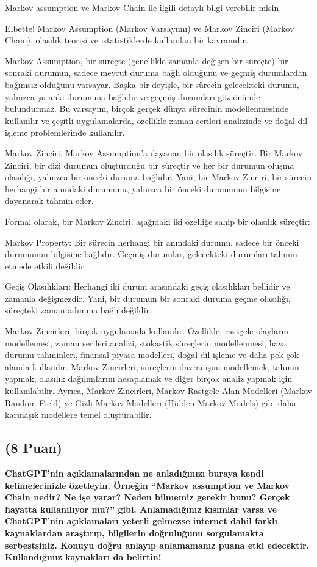 \documentclass[11pt]{article}
\begin{document}
Markov assumption ve Markov Chain ile ilgili detaylı bilgi verebilir misin 

Elbette! Markov Assumption (Markov Varsayımı) ve Markov Zinciri (Markov Chain), olasılık teorisi ve istatistiklerde kullanılan bir kavramdır.

Markov Assumption, bir süreçte (genellikle zamanla değişen bir süreçte) bir sonraki durumun, sadece mevcut duruma bağlı olduğunu ve geçmiş durumlardan bağımsız olduğunu varsayar. Başka bir deyişle, bir sürecin gelecekteki durumu, yalnızca şu anki durumuna bağlıdır ve geçmiş durumları göz önünde bulundurmaz. Bu varsayım, birçok gerçek dünya sürecinin modellenmesinde kullanılır ve çeşitli uygulamalarda, özellikle zaman serileri analizinde ve doğal dil işleme problemlerinde kullanılır.

Markov Zinciri, Markov Assumption'a dayanan bir olasılık süreçtir. Bir Markov Zinciri, bir dizi durumun oluşturduğu bir süreçtir ve her bir durumun oluşma olasılığı, yalnızca bir önceki duruma bağlıdır. Yani, bir Markov Zinciri, bir sürecin herhangi bir anındaki durumunu, yalnızca bir önceki durumunun bilgisine dayanarak tahmin eder.

Formal olarak, bir Markov Zinciri, aşağıdaki iki özelliğe sahip bir olasılık süreçtir:

Markov Property: Bir sürecin herhangi bir anındaki durumu, sadece bir önceki durumunun bilgisine bağlıdır. Geçmiş durumlar, gelecekteki durumları tahmin etmede etkili değildir.

Geçiş Olasılıkları: Herhangi iki durum arasındaki geçiş olasılıkları bellidir ve zamanla değişmezdir. Yani, bir durumun bir sonraki duruma geçme olasılığı, süreçteki zaman adımına bağlı değildir.

Markov Zincirleri, birçok uygulamada kullanılır. Özellikle, rastgele olayların modellemesi, zaman serileri analizi, stokastik süreçlerin modellenmesi, hava durumu tahminleri, finansal piyasa modelleri, doğal dil işleme ve daha pek çok alanda kullanılır. Markov Zincirleri, süreçlerin davranışını modellemek, tahmin yapmak, olasılık dağılımlarını hesaplamak ve diğer birçok analiz yapmak için kullanılabilir. Ayrıca, Markov Zincirleri, Markov Rastgele Alan Modelleri (Markov Random Field) ve Gizli Markov Modelleri (Hidden Markov Models) gibi daha karmaşık modellere temel oluşturabilir.

\subsection{(8 Puan)} \textbf{ChatGPT’nin açıklamalarından ne anladığınızı buraya kendi kelimelerinizle özetleyin. Örneğin ``Markov assumption ve Markov Chain nedir? Ne işe yarar? Neden bilmemiz gerekir bunu? Gerçek hayatta kullanılıyor mu?'' gibi. Anlamadığınız kısımlar varsa ve ChatGPT’nin açıklamaları yeterli gelmezse internet dahil farklı kaynaklardan araştırıp, bilgilerin doğruluğunu sorgulamakta serbestsiniz. Konuyu doğru anlayıp anlamamanız puana etki edecektir. Kullandığınız kaynakları da belirtin!}
\end{document}
